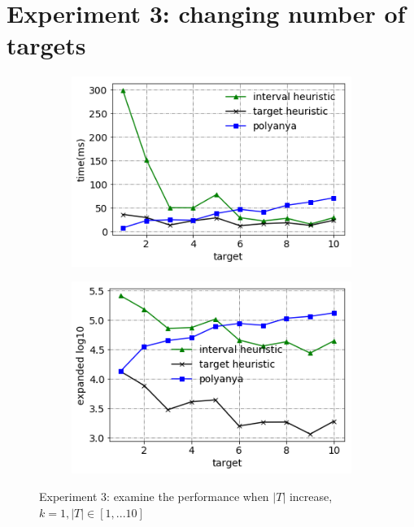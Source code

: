 \section{Experiment 3: changing number of targets}

\begin{figure}[!htb]
    \centering
    \begin{subfigure}{0.5\textwidth}
        \centering
        \includegraphics[width=.9\textwidth]{pic/e3_time.png}
        \caption{}
        \label{e3_time}
    \end{subfigure}%
    \hfill
    \begin{subfigure}{0.5\textwidth}
        \centering
        \includegraphics[width=.9\textwidth]{pic/e3_gen.png}
        \caption{}
        \label{e3_gen}
    \end{subfigure}
    \caption{\small Experiment 3: examine the performance when $|T|$ increase, $k=1, |T| \in [1,...10]$}
\end{figure}

